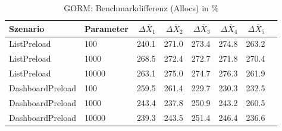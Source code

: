 
\begin{table}[ht]
\setlength{\extrarowheight}{-1pt}
\centering
\caption{GORM: Benchmarkdifferenz (Allocs) in \%}
\begin{tabular}{llrrrrrr}
\toprule
Szenario & Parameter & ${\Delta \overline{X}_1}$ & ${\Delta \overline{X}_2}$ & ${\Delta \overline{X}_3}$ & ${\Delta \overline{X}_4}$ & ${\Delta \overline{X}_5}$ \\
\midrule
	ListPreload & 100 & \cellcolor{red!30}  240.1 & \cellcolor{red!30}  271.0 & \cellcolor{red!30}  273.4 & \cellcolor{red!30}  274.8 & \cellcolor{red!30}  263.2 \\
	ListPreload & 1000 & \cellcolor{red!30}  268.5 & \cellcolor{red!30}  272.4 & \cellcolor{red!30}  272.7 & \cellcolor{red!30}  271.8 & \cellcolor{red!30}  270.4 \\
	ListPreload & 10000 & \cellcolor{red!30}  263.1 & \cellcolor{red!30}  275.0 & \cellcolor{red!30}  274.7 & \cellcolor{red!30}  276.3 & \cellcolor{red!30}  261.9 \\
	DashboardPreload & 100 & \cellcolor{red!30}  259.5 & \cellcolor{red!30}  261.4 & \cellcolor{red!30}  229.7 & \cellcolor{red!30}  230.3 & \cellcolor{red!30}  232.5 \\
	DashboardPreload & 1000 & \cellcolor{red!30}  243.4 & \cellcolor{red!30}  237.8 & \cellcolor{red!30}  250.9 & \cellcolor{red!30}  243.2 & \cellcolor{red!30}  260.5 \\
	DashboardPreload & 10000 & \cellcolor{red!30}  239.3 & \cellcolor{red!30}  243.5 & \cellcolor{red!30}  251.4 & \cellcolor{red!30}  246.4 & \cellcolor{red!30}  236.6 \\
\bottomrule
\end{tabular}
\label{tab:benchmarkdifferenz_gorm_allocs}
\end{table}
	